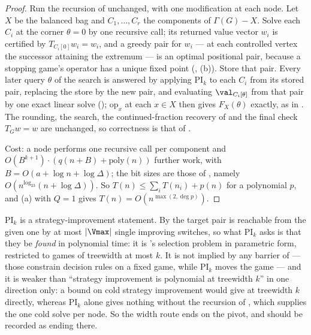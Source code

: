 \begin{proof}
Run the recursion of  unchanged, with one modification at each
node. Let $X$ be the balanced bag and $C_1,\dots,C_r$ the components of
$\Gamma(G)-X$. Solve each $C_i$ at the corner $\theta=0$ by one recursive call;
its returned value vector $w_i$ is certified by $T_{C_i[0]}w_i=w_i$, and a
greedy pair for $w_i$ --- at each controlled vertex the successor attaining the
extremum --- is an optimal positional pair, because a stopping game's operator
has a unique fixed point (, (b)).
Store that pair. Every later query $\theta$ of the search is answered by
applying $\mathrm{PI}_k$ to each $C_i$ from its stored pair, replacing the store
by the new pair, and evaluating $\val_{C_i[\theta]}$ from that pair by one exact
linear solve (); $\mathrm{op}_x$ at each $x\in X$ then
gives $F_X(\theta)$ exactly, as in . The rounding, the
 search, the continued-fraction recovery of
 and the final check $T_Gw=w$ are unchanged, so
correctness is that of .

Cost: a node performs one recursive call per component and
$O(B^{k+1})\cdot(q(n+B)+\mathrm{poly}(n))$ further work, with
$B=O(a+\log n+\log\Delta)$; the bit sizes are those of , namely
$O(n^{\log_23}(n+\log\Delta))$. So $T(n)\le\sum_iT(n_i)+p(n)$ for a polynomial
$p$, and (a) with $Q=1$ gives $T(n)=O(n^{\max(2,\deg p)})$.
\end{proof}

\begin{remark}\label{wa:pi-is-the-pivot}
$\mathrm{PI}_k$ is a strategy-improvement statement. By 
the target pair is reachable from the given one by at most $|\Vmax|$ single
improving switches, so what $\mathrm{PI}_k$ asks is that they be \emph{found} in
polynomial time: it is 's selection problem in parametric
form, restricted to games of treewidth at most $k$. It is not implied by any
barrier of  --- those constrain decision rules on a fixed game,
while $\mathrm{PI}_k$ moves the game --- and it is weaker than ``strategy
improvement is polynomial at treewidth $k$'' in one direction only: a bound on
cold strategy improvement would give  at treewidth $k$ directly,
whereas $\mathrm{PI}_k$ alone gives nothing without the recursion of
, which supplies the one cold solve per node. So the width
route ends on the pivot, and should be recorded as ending there.
\end{remark}

